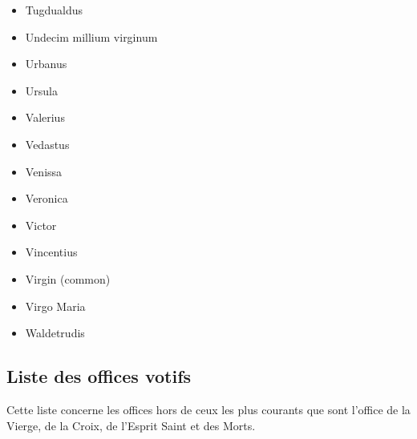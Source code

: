 \documentclass[a4paper,12pt,twoside]{book}
\begin{document}
\begin{multicols}{2}
\begin{itemize}
\item Tugdualdus
\item Undecim millium virginum
\item Urbanus
\item Ursula
\item Valerius
\item Vedastus
\item Venissa
\item Veronica
\item Victor
\item Vincentius
\item Virgin (common)
\item Virgo Maria
\item Waldetrudis
	\end{itemize}
	\end{multicols}
	
	\subsection{Liste des offices votifs}
	
	Cette liste concerne les offices hors de ceux les plus courants que sont l'office de la Vierge, de la Croix, de l'Esprit Saint et des Morts. 
	
\end{document}
